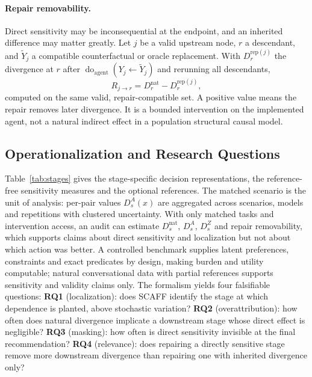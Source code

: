 \documentclass[runningheads]{llncs}
\newcommand{\doagent}{\operatorname{do}_{\mathrm{agent}}}
\begin{document}
\paragraph{Repair removability.}
Direct sensitivity may be inconsequential at the endpoint, and an inherited difference may
matter greatly. Let $j$ be a valid upstream node, $r$ a descendant, and $\widetilde Y_j$ a
compatible counterfactual or oracle replacement. With $D_r^{\mathrm{rep}(j)}$ the divergence at
$r$ after $\doagent(Y_j\leftarrow\widetilde Y_j)$ and rerunning all descendants,
\begin{equation}
\label{eq:repair}
R_{j\rightarrow r}=D_r^{\mathrm{nat}}-D_r^{\mathrm{rep}(j)},
\end{equation}
computed on the same valid, repair-compatible set. A positive value means the repair removes
later divergence. It is a bounded intervention on the implemented agent, not a natural indirect
effect in a population structural causal model.

\subsection{Operationalization and Research Questions}

Table~\ref{tab:stages} gives the stage-specific decision representations, the reference-free
sensitivity measures and the optional references. The matched scenario is the unit of analysis:
per-pair values $D_s^A(x)$ are aggregated across scenarios, models and repetitions with clustered
uncertainty. With only matched tasks and intervention access, an audit can estimate
$D_s^{\mathrm{nat}}$, $D_s^A$, $D_s^Z$ and repair removability, which supports claims about
direct sensitivity and localization but not about which action was better. A controlled
benchmark supplies latent preferences, constraints and exact predicates by design, making burden
and utility computable; natural conversational data with partial references supports
sensitivity and validity claims only. The formalism yields four falsifiable questions:
\textbf{RQ1} (localization): does SCAFF identify the stage at which dependence is planted, above
stochastic variation? \textbf{RQ2} (overattribution): how often does natural divergence implicate a
downstream stage whose direct effect is negligible? \textbf{RQ3} (masking): how often is direct
sensitivity invisible at the final recommendation? \textbf{RQ4} (relevance): does repairing a
directly sensitive stage remove more downstream divergence than repairing one with inherited
divergence only?
\end{document}
